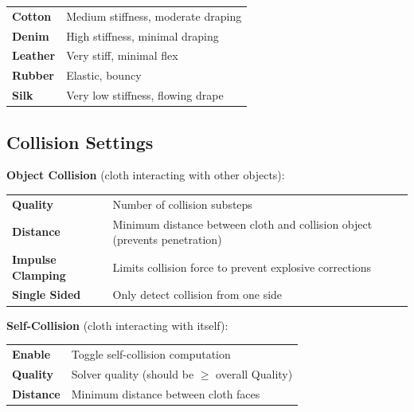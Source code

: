 \begin{center}
\begin{tabularx}{\textwidth}{L{3cm}X}
\toprule
{}
 &  \\
\midrule
\textbf{Cotton} & Medium stiffness, moderate draping \\
\textbf{Denim} & High stiffness, minimal draping \\
\textbf{Leather} & Very stiff, minimal flex \\
\textbf{Rubber} & Elastic, bouncy \\
\textbf{Silk} & Very low stiffness, flowing drape \\
\bottomrule
\end{tabularx}
\end{center}

\subsection{Collision Settings}

\textbf{Object Collision} (cloth interacting with other objects):

\begin{center}
\begin{tabularx}{\textwidth}{L{3cm}X}
\toprule
{}
 &  \\
\midrule
\textbf{Quality} & Number of collision substeps \\
\textbf{Distance} & Minimum distance between cloth and collision object (prevents penetration) \\
\textbf{Impulse Clamping} & Limits collision force to prevent explosive corrections \\
\textbf{Single Sided} & Only detect collision from one side \\
\bottomrule
\end{tabularx}
\end{center}

\textbf{Self-Collision} (cloth interacting with itself):

\begin{center}
\begin{tabularx}{\textwidth}{L{3cm}X}
\toprule
{}
 &  \\
\midrule
\textbf{Enable} & Toggle self-collision computation \\
\textbf{Quality} & Solver quality (should be $\geq$ overall Quality) \\
\textbf{Distance} & Minimum distance between cloth faces \\
\bottomrule
\end{tabularx}
\end{center}

